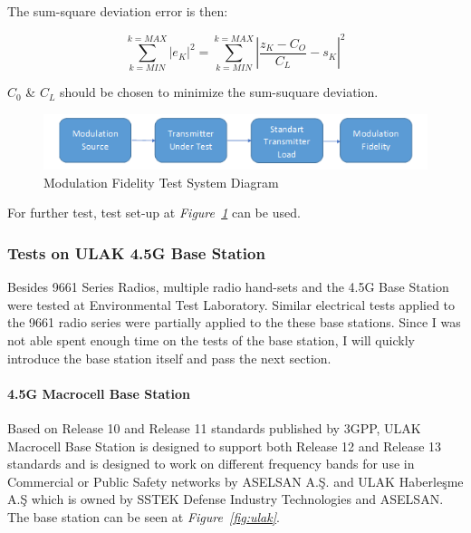 	The sum-square deviation error is then:
	
$$	\sum_{k=MIN}^{k=MAX} {|e_K|}^2 = \sum_{k=MIN}^{k=MAX} {|\frac{z_K - C_O}{C_L}-s_K|}^2	$$
	
	$C_0$ \& $C_L$ should be chosen to minimize the sum-suquare deviation.
	
	
\begin{figure}[H]
	\center
	\setlength{\unitlength}{\textwidth} 
	\includegraphics[width=1.0\unitlength]{modfide}
	\caption{\label{fig:modfide}Modulation Fidelity Test System Diagram }
\end{figure}


	For further test, test set-up at \textit{Figure~\ref{fig:modfide}} can be used. 





\subsubsection{Tests on ULAK 4.5G Base Station  }
\- \indent
	Besides 9661 Series Radios, multiple radio hand-sets and the 4.5G Base Station were tested at Environmental Test Laboratory. Similar electrical tests applied to the 9661 radio series were partially applied to the these base stations. Since I was not able spent enough time on the tests of the base station, I will quickly introduce the base station itself and pass the next section. 

\paragraph{4.5G Macrocell Base Station}
\- \indent
	Based on Release 10 and Release 11 standards published by 3GPP, ULAK Macrocell Base Station is designed to support both Release 12 and Release 13 standards and is designed to work on different frequency bands for use in Commercial or Public Safety networks\cite{ulak} by ASELSAN A.Ş. and ULAK Haberleşme A.Ş which is owned by SSTEK Defense Industry Technologies and ASELSAN.  The base station can be seen at \textit{Figure~\ref{fig:ulak}}.

